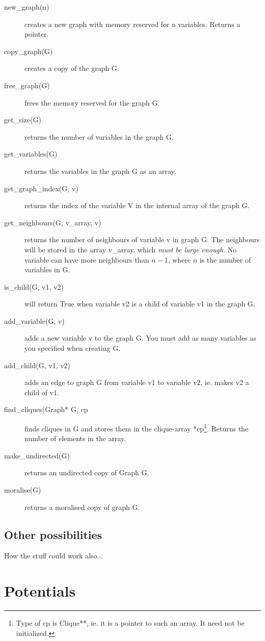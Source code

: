 \documentclass[12pt,a4paper]{report}
\begin{document}
\begin{description}
\item[new\_graph(n)] creates a new graph with memory reserved for n variables. Returns a pointer.
\item[copy\_graph(G)] creates a copy of the graph G.
\item[free\_graph(G)] frees the memory reserved for the graph G.
\item[get\_size(G)] returns the number of variables in the graph G.
\item[get\_variables(G)] returns the variables in the graph G as an array.
\item[get\_graph\_index(G, v)] returns the index of the
variable V in the internal array of the graph G.
\item[get\_neighbours(G, v_array, v)] returns the number of neighbours of variable v in graph G. The neighbours will be stored in the array v_array, which {\it must be large enough}. No variable can have more neighbours than $n-1$, where $n$ is the number of variables in G.
\item[is\_child(G, v1, v2)] will return True when variable v2 is a child of variable v1 in the graph G. 
\item[add\_variable(G, v)] adds a new variable v to the graph G. You must add as many variables as you specified when creating G.
\item[add\_child(G, v1, v2)] adds an edge to graph G from variable v1 to variable v2, ie. makes v2 a child of v1.
\item[find\_cliques(Graph* G, cp] finds cliques in G and stores them
in the clique-array *cp\footnote{Type of cp is Clique**, ie. it is a
pointer to such an array. It need not be initialized.}. Returns the
number of elements in the array.
\item[make_undirected(G)] returns an undirected copy of Graph G.
\item[moralise(G)] returns a moralised copy of graph G.




\end{description}

\subsection{Other possibilities}

How the stuff could work also...


\newpage
\section{Potentials}
\end{document}
